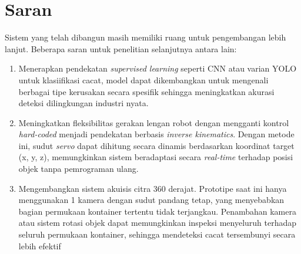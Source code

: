 \section{Saran}
Sistem yang telah dibangun masih memiliki ruang untuk pengembangan
lebih lanjut. Beberapa saran untuk penelitian selanjutnya antara lain:
\begin{enumerate}
  \item Menerapkan pendekatan \textit{supervised learning} seperti
    CNN atau varian YOLO untuk klasiifikasi cacat, model dapat
    dikembangkan untuk mengenali berbagai tipe kerusakan secara
    spesifik sehingga meningkatkan akurasi deteksi dilingkungan industri nyata.
  \item Meningkatkan fleksibilitas gerakan lengan robot dengan
    mengganti kontrol \textit{hard-coded} menjadi pendekatan berbasis
    \textit{inverse kinematics}. Dengan metode ini, sudut
    \textit{servo} dapat dihitung secara dinamis berdasarkan
    koordinat target (x, y, z), memungkinkan
    sistem beradaptasi secara \textit{real-time} terhadap posisi
    objek tanpa pemrograman ulang.
  \item Mengembangkan sistem akuisis citra 360 derajat. Prototipe
    saat ini hanya menggunakan 1 kamera dengan sudut pandang tetap,
    yang menyebabkan bagian permukaan kontainer tertentu tidak
    terjangkau. Penambahan kamera atau sistem rotasi objek dapat
    memungkinkan inspeksi menyeluruh terhadap seluruh permukaan
    kontainer, sehingga mendeteksi cacat tersembunyi secara lebih efektif
\end{enumerate}
